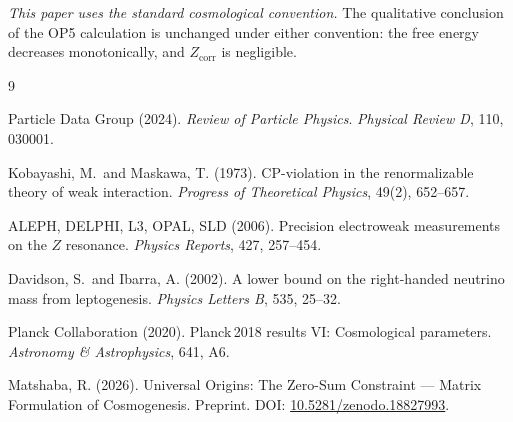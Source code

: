 \documentclass[12pt,a4paper]{article}
\theoremstyle{definition}
\newcommand{\Zcorr}{Z_{\mathrm{corr}}}
\begin{document}
\emph{This paper uses the standard cosmological convention.}
The qualitative conclusion of the OP5 calculation is unchanged under either
convention: the free energy decreases monotonically, and $\Zcorr$ is
negligible.

\begin{thebibliography}{9}

  Particle Data Group (2024). \textit{Review of Particle Physics}.
  \textit{Physical Review D}, 110, 030001.

  Kobayashi, M.\ and Maskawa, T. (1973).
  CP-violation in the renormalizable theory of weak interaction.
  \textit{Progress of Theoretical Physics}, 49(2), 652--657.

  ALEPH, DELPHI, L3, OPAL, SLD (2006).
  Precision electroweak measurements on the $Z$ resonance.
  \textit{Physics Reports}, 427, 257--454.

  Davidson, S.\ and Ibarra, A. (2002).
  A lower bound on the right-handed neutrino mass from leptogenesis.
  \textit{Physics Letters B}, 535, 25--32.

  Planck Collaboration (2020).
  Planck\,2018 results VI: Cosmological parameters.
  \textit{Astronomy \& Astrophysics}, 641, A6.

  Matshaba, R. (2026).
  Universal Origins: The Zero-Sum Constraint --- Matrix Formulation of Cosmogenesis.
  Preprint. DOI: \href{https://doi.org/10.5281/zenodo.18827993}{10.5281/zenodo.18827993}.

\end{thebibliography}
\end{document}
